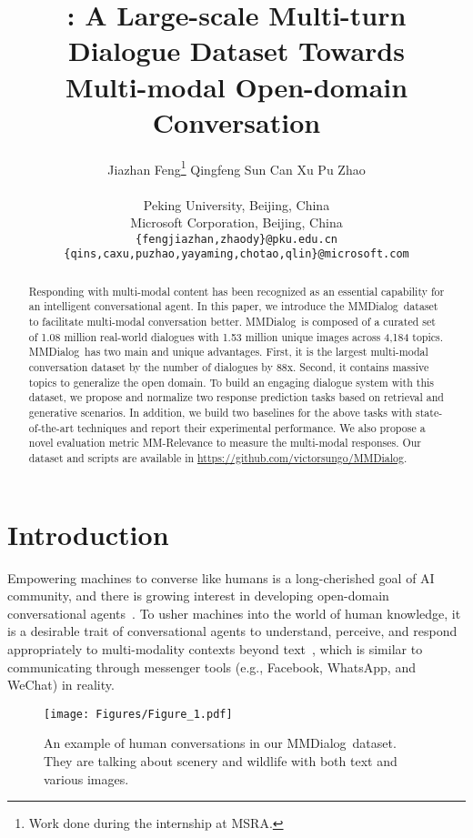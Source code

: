 \documentclass[11pt]{article}
\title{\DataName: A Large-scale Multi-turn Dialogue Dataset Towards \\ Multi-modal Open-domain Conversation}
\author{Jiazhan Feng\thanks{\quad Work done during the internship at MSRA.} \quad Qingfeng Sun \quad  Can Xu  \quad Pu Zhao\\ \quad {\bf Yaming Yang} \quad {\bf Chongyang Tao} \quad {\bf Dongyan Zhao}  \quad {\bf Qingwei Lin}  \\
      Peking University, Beijing, China \\ Microsoft Corporation, Beijing, China\\ 
      \texttt{\{fengjiazhan,zhaody\}@pku.edu.cn}\\
      \texttt{\{qins,caxu,puzhao,yayaming,chotao,qlin\}@microsoft.com}}
\newcommand{\DataName}{MMDialog}
\begin{document}
\maketitle

\begin{abstract}

Responding with multi-modal content has been recognized as an essential capability for an intelligent conversational agent. In this paper, we introduce the \DataName~dataset to facilitate multi-modal conversation better. \DataName~is composed of a curated set of 1.08 million real-world dialogues with 1.53 million unique images across 4,184 topics. \DataName~has two main and unique advantages. First, it is the largest multi-modal conversation dataset by the number of dialogues by 88x. Second, it contains massive topics to generalize the open domain. To build an engaging dialogue system with this dataset, we propose and normalize two response prediction tasks based on retrieval and generative scenarios. In addition, we build two baselines for the above tasks with state-of-the-art techniques and report their experimental performance. We also propose a novel evaluation metric MM-Relevance to measure the multi-modal responses. Our dataset and scripts are available in \url{https://github.com/victorsungo/MMDialog}.



 \end{abstract}

\section{Introduction}



Empowering machines to converse like humans is a long-cherished goal of AI community, and there is growing interest in developing open-domain conversational agents~\cite{li-etal-2017-adversarial,gao2018neural,ghazvininejad2018knowledge,zhou2018emotional}. To usher machines into the world of human knowledge, it is a desirable trait of conversational agents to understand, perceive, and respond appropriately to multi-modality contexts beyond text~\cite{das2017visual,mostafazadeh-etal-2017-image,shuster-etal-2020-image}, which is similar to communicating through messenger tools (e.g., Facebook, WhatsApp, and WeChat) in reality.


\begin{figure}[!htb]
\centering
     \texttt{[image: Figures/Figure\_1.pdf]}
     \caption{An example of human conversations in our \DataName~dataset. They are talking about scenery and wildlife with both text and various images.}
     \label{fig:intro_case}
\end{figure}
\end{document}

